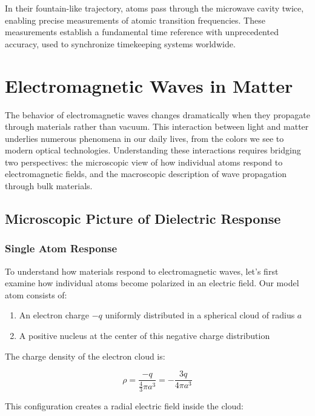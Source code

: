 \documentclass[
  a4paper,
]{book}
\providecommand{\tightlist}{%
  \setlength{\itemsep}{0pt}\setlength{\parskip}{0pt}}
\begin{document}
In their fountain-like trajectory, atoms pass through the microwave
cavity twice, enabling precise measurements of atomic transition
frequencies. These measurements establish a fundamental time reference
with unprecedented accuracy, used to synchronize timekeeping systems
worldwide.

\chapter{Electromagnetic Waves in
Matter}\label{electromagnetic-waves-in-matter}

The behavior of electromagnetic waves changes dramatically when they
propagate through materials rather than vacuum. This interaction between
light and matter underlies numerous phenomena in our daily lives, from
the colors we see to modern optical technologies. Understanding these
interactions requires bridging two perspectives: the microscopic view of
how individual atoms respond to electromagnetic fields, and the
macroscopic description of wave propagation through bulk materials.

\section{Microscopic Picture of Dielectric
Response}\label{microscopic-picture-of-dielectric-response}

\subsection{Single Atom Response}\label{single-atom-response}

To understand how materials respond to electromagnetic waves, let's
first examine how individual atoms become polarized in an electric
field. Our model atom consists of:

\begin{enumerate}
\def\labelenumi{\arabic{enumi}.}
\tightlist
\item
  An electron charge \(-q\) uniformly distributed in a spherical cloud
  of radius \(a\)
\item
  A positive nucleus at the center of this negative charge distribution
\end{enumerate}

The charge density of the electron cloud is:

\[
\rho=\frac{-q}{\frac{4}{3}\pi a^{3}}=-\frac{3q}{4\pi a^3}
\]

This configuration creates a radial electric field inside the cloud:
\end{document}
